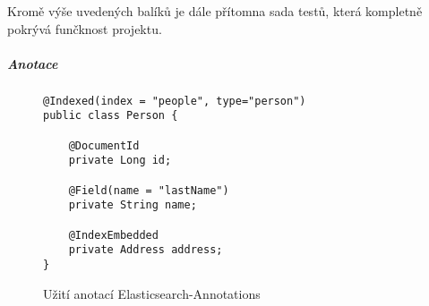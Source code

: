 \documentclass[11pt,oneside]{fithesis2}
\begin{document}
Kromě výše uvedených balíků je dále přítomna sada testů, která kompletně pokrývá funčknost projektu. 

\subparagraph{Anotace}
\label{EsAnnotationsAnotace}
\begin{figure}[!htbp]
\begin{lstlisting}[frame=single]
@Indexed(index = "people", type="person")
public class Person {

	@DocumentId
	private Long id;

	@Field(name = "lastName")
	private String name;

	@IndexEmbedded
	private Address address;
}
\end{lstlisting}
\caption{Užití anotací Elasticsearch-Annotations}
\label{AnnotationsExample}
\end{figure}
\end{document}
